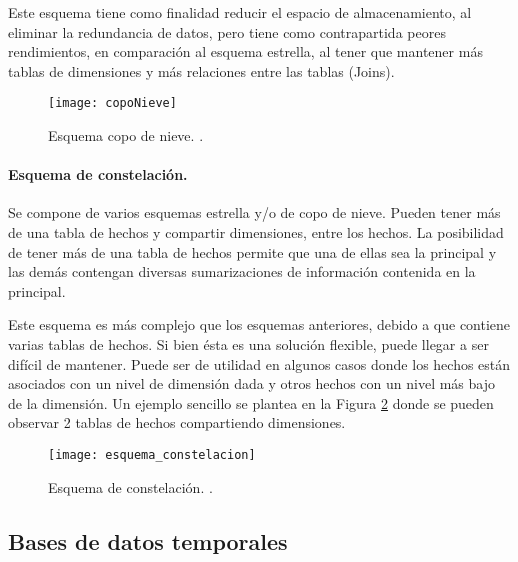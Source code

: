 \documentclass[a4paper,11pt]{article}
\begin{document}
    Este esquema tiene como finalidad reducir el espacio de almacenamiento, al eliminar la redundancia de datos, pero tiene como contrapartida
    peores rendimientos, en comparación al esquema estrella, al tener que mantener más tablas de dimensiones y más relaciones entre las tablas (Joins).
    
    \begin{figure}
      \begin{center}
        \texttt{[image: copoNieve]}
        \caption{Esquema copo de nieve. \cite[p.~39]{hefestov2}.}
        \label{snow_flk_sch}
      \end{center}
    \end{figure}
    
    
    \paragraph{Esquema de constelación.}
    
    Se compone de varios esquemas estrella y/o de copo de nieve. Pueden tener más de una tabla de hechos y compartir dimensiones, entre los hechos.
    La posibilidad de tener más de una tabla de hechos permite que una de ellas sea la principal y las demás contengan diversas sumarizaciones de información
    contenida en la principal.
    
    Este esquema es más complejo que los esquemas anteriores, debido a que contiene varias tablas de hechos. Si bien ésta es una solución flexible, puede 
    llegar a ser difícil de mantener. Puede ser de utilidad en algunos casos donde los hechos están asociados con un nivel de dimensión dada y otros hechos 
    con un nivel más bajo de la dimensión. Un ejemplo sencillo se plantea en la Figura \ref{const_sch} donde se pueden observar 2 tablas de hechos 
    compartiendo dimensiones.
    
    \begin{figure}
      \begin{center}
        \texttt{[image: esquema\_constelacion]}
        \caption{Esquema de constelación. \cite[p.~41]{hefestov2}.}
        \label{const_sch}
      \end{center}
    \end{figure}
    
    
    \subsection{Bases de datos temporales}
    
\end{document}
